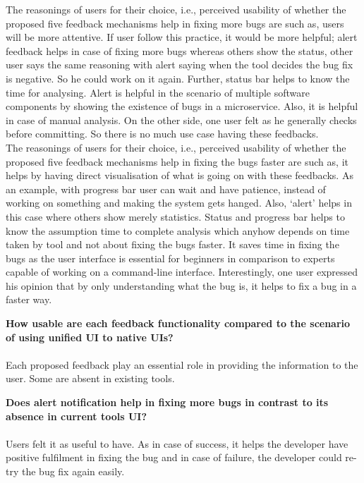 The reasonings of users for their choice, i.e., perceived usability of whether the proposed five feedback mechanisms help in fixing more bugs are such as, users will be more attentive. If user follow this practice, it would be more helpful; alert feedback helps in case of fixing more bugs whereas others show the status, other user says the same reasoning with alert saying when the tool decides the bug fix is negative. So he could work on it again. Further, status bar helps to know the time for analysing. Alert is helpful in the scenario of multiple software components by showing the existence of bugs in a microservice. Also, it is helpful in case of manual analysis. On the other side, one user felt as he generally checks before committing. So there is no much use case having these feedbacks.  \\

The reasonings of users for their choice, i.e., perceived usability of whether the proposed five feedback mechanisms help in fixing the bugs faster are such as, it helps by having direct visualisation of what is going on with these feedbacks. As an example, with progress bar user can wait and have patience, instead of working on something and making the system gets hanged. Also, ‘alert’ helps in this case where others show merely statistics. Status and progress bar helps to know the assumption time to complete analysis which anyhow depends on time taken by tool and not about fixing the bugs faster. It saves time in fixing the bugs as the user interface is essential for beginners in comparison to experts capable of working on a command-line interface. Interestingly, one user expressed his opinion that by only understanding what the bug is, it helps to fix a bug in a faster way. \\

\begin{myboxi}{{\textbf{How usable are each feedback functionality compared to the scenario of using unified UI to native UIs?}}}
	\\ \\ Each proposed feedback play an essential role in providing the information to the user. Some are absent in existing tools. \\
\end{myboxi}
\clearpage
\begin{myboxi}{{\textbf{Does alert notification help in fixing more bugs in contrast to its absence in current tools UI?}}}
	\\ \\ Users felt it as useful to have. As in case of success, it helps the developer have positive fulfilment in fixing the bug and in case of failure, the developer could re-try the bug fix again easily. \\
\end{myboxi}

